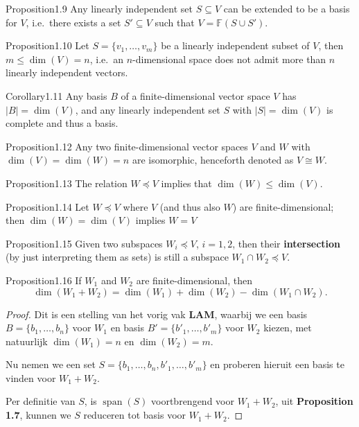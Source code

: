 \begin{res}{Proposition}{1.9}
Any linearly independent set $S\subseteq V$ can be extended to be a basis for $V$, i.e.\ there exists a set $S'\subseteq V$ such that $V=\mathbb F(S\cup S')$.
\end{res}

\begin{res}{Proposition}{1.10}
Let $S=\{v_1,\dots,v_m\}$ be a linearly independent subset of $V$, then $m\le\dim(V)=n$, i.e.\ an $n$-dimensional space does not admit more than $n$ linearly independent vectors.
\end{res}

\begin{res}{Corollary}{1.11}
Any basis $B$ of a finite-dimensional vector space $V$ has $|B|=\dim(V)$, and any linearly independent set $S$ with $|S|=\dim(V)$ is complete and thus a basis.
\end{res}

\begin{res}{Proposition}{1.12}
Any two finite-dimensional vector spaces $V$ and $W$ with $\dim(V)=\dim(W)=n$ are isomorphic, henceforth denoted as $V\cong W$.
\end{res}

\begin{res}{Proposition}{1.13}
The relation $W\preccurlyeq V$ implies that $\dim(W)\le\dim(V)$.
\end{res}

\begin{res}{Proposition}{1.14}
Let $W\preccurlyeq V$ where $V$ (and thus also $W$) are finite-dimensional; then $\dim(W)=\dim(V)$ implies $W=V$
\end{res}

\begin{res}{Proposition}{1.15}
Given two subspaces $W_i\preccurlyeq V$, $i=1,2$, then their \textbf{intersection} (by just interpreting them as sets) is still a subspace $W_1\cap W_2\preccurlyeq V$.
\end{res}

\begin{res}{Proposition}{1.16}
If $W_1$ and $W_2$ are finite-dimensional, then
\begin{equation}\dim(W_1+W_2)=\dim(W_1)+\dim(W_2)-\dim(W_1\cap W_2).\tag{1.16}\end{equation}
\end{res}
\begin{proof}
    Dit is een stelling van het vorig vak \textbf{LAM}, waarbij we een basis \(B = \{b_1,\dots,b_n\}\) voor \(W_1\)
    en basis \(B' = \{b'_1, \dots, b'_m \}\) voor \(W_2\) kiezen,
    met natuurlijk \(\dim(W_1) = n\) en \(\dim(W_2) = m\).

    Nu nemen we een set \(S = \{b_1,\dots,b_n,b'_1,\dots,b'_m \}\) en proberen hieruit een basis te vinden voor \(W_1 + W_2\).

    Per definitie van \(S\), is \(\operatorname{span}(S)\) voortbrengend voor \(W_1 + W_2\), uit \textbf{Proposition 1.7}, kunnen we \(S\) reduceren tot basis voor \(W_1+W_2\).
\end{proof}



